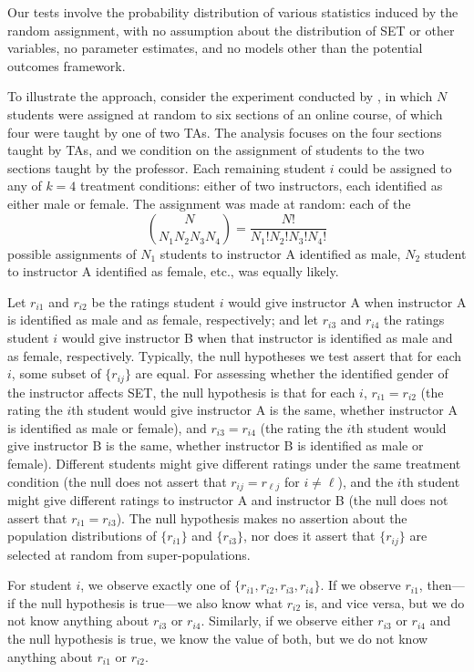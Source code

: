 \documentclass[12pt]{article}
\newcommand{\beq}{\begin{equation}}
\newcommand{\eeq}{\end{equation}}
\begin{document}
Our tests involve the probability distribution of various statistics induced by the random
assignment, with no assumption about the distribution of SET or other variables, 
no parameter estimates, and no models other than the potential outcomes 
framework.

To illustrate the approach, consider the experiment conducted by \citet{MacNell2014},
in which $N$ students were assigned at random to six sections of an online course,
of which four were taught by one of two TAs.
The analysis focuses on the four sections taught by TAs,
and we condition on the assignment of students to the two sections taught by the professor.
Each remaining student $i$ could be assigned to any of $k=4$ treatment conditions:
either of two instructors, each identified as either male or female.
The assignment was made at random: each of the
\beq
 {{N}\choose{N_1 N_2 N_3 N_4}} = \frac{N!}{N_1! N_2! N_3! N_4!}
\eeq
possible assignments of $N_1$ students to instructor A identified as male,
$N_2$ student to instructor A identified as female, etc., was equally likely.

Let $r_{i1}$ and $r_{i2}$ be the ratings student $i$ would give instructor A when instructor 
A is identified as male and as female, respectively; and let 
$r_{i3}$ and $r_{i4}$ the ratings student $i$ would give instructor B when that instructor
is identified as male and as female, respectively.
Typically, the null hypotheses we test assert that for each $i$, some subset of
$\{r_{ij}\}$ are  equal.
For assessing whether the identified gender of the instructor affects SET,
the null hypothesis is that for each $i$,
$r_{i1} = r_{i2}$ (the rating the $i$th student would give instructor A is the same,
whether instructor A is identified as male or female), 
and $r_{i3} = r_{i4}$ (the rating the $i$th student would give instructor B is
the same, whether instructor B is identified as male or female).
Different students might give different ratings under the same treatment condition
(the null does not assert that $r_{ij} = r_{\ell j}$ for $i \ne \ell$), and
the $i$th student might 
give different ratings to instructor A and instructor B
(the null does not assert that $r_{i1} = r_{i3}$).
The null hypothesis makes no assertion about the population distributions of 
$\{r_{i1}\}$ and $\{r_{i3}\}$, nor does it assert that $\{r_{ij}\}$ are 
selected at random from super-populations.

For student $i$, we observe exactly one of $\{r_{i1}, r_{i2}, r_{i3}, r_{i4}\}$.
If we observe $r_{i1}$, then---if the null hypothesis is true---we also know what $r_{i2}$ is,
and vice versa, but we do not know anything about $r_{i3}$ or $r_{i4}$.
Similarly, if we observe either $r_{i3}$ or $r_{i4}$ and the null hypothesis is true,
we know the value of both, but we do not know anything about $r_{i1}$ or $r_{i2}$.
\end{document}
